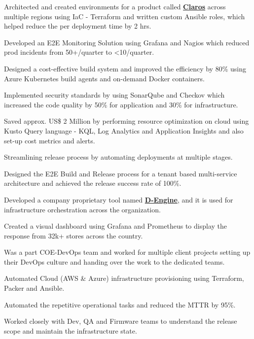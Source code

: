\documentclass[a4paper]{deedy-resume-openfont}
\begin{document}
\begin{tightemize}
\item Architected and created environments for a product called \href{https://www.hach.com/claros/overview#claros-video}{\bf Claros} across multiple regions using IaC - Terraform and written custom Ansible roles, which helped reduce the per deployment time by 2 hrs.
\item Developed an E2E Monitoring Solution using Grafana and Nagios which reduced prod incidents from 50+/quarter to <10/quarter.
\item Designed a cost-effective build system and improved the efficiency by 80\% using Azure Kubernetes build agents and on-demand Docker containers.
\item Implemented security standards by using SonarQube and Checkov which increased the code quality by 50\% for application and 30\% for infrastructure.
\item Saved approx. US\$ 2 Million by performing resource optimization on cloud using Kusto Query language - KQL, Log Analytics and Application Insights and also set-up cost metrics and alerts.
\item Streamlining release process by automating deployments at multiple stages.
\end{tightemize}
\sectionsep

\begin{tightemize}
\item Designed the E2E Build and Release process for a tenant based multi-service architecture and achieved the release success rate of 100\%.
\item Developed a company proprietary tool named \href{https://www.youtube.com/watch?v=YWLU2OU13tA}{\bf D-Engine}, and it is used for infrastructure orchestration across the organization.
\item Created a visual dashboard using Grafana and Prometheus to display the response from 32k+ stores across the country.
\item Was a part COE-DevOps team and worked for multiple client projects setting up their DevOps culture and handing over the work to the dedicated teams.
\item Automated Cloud (AWS \& Azure) infrastructure provisioning using Terraform, Packer and Ansible.
\item Automated the repetitive operational tasks and reduced the MTTR by 95\%.
\item Worked closely with Dev, QA and Firmware teams to understand the release scope and maintain the infrastructure state.
\end{tightemize}
\end{document}
